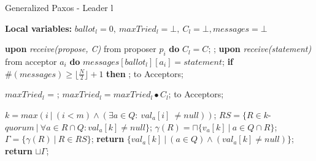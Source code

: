 \begin{algorithm}
	\caption{Generalized Paxos - Leader l}
	\textbf{Local variables:} $ballot_l = 0,\ maxTried_l = \bot,\ C_l = \bot, messages = \bot$
	\begin{algorithmic}[1]
		\State \textbf{upon} \textit{receive(propose, C)} from proposer $p_i$ \textbf{do} 
		\State \hspace{\algorithmicindent} $C_l = C$;
		\State \hspace{\algorithmicindent} ;
		\State
		\State \textbf{upon} \textit{receive(statement)} from acceptor $a_i$ \textbf{do}
		\State \hspace{\algorithmicindent}  $messages[ballot_l][a_i] = statement$;
		\State \hspace{\algorithmicindent} \textbf{if} $\#(messages) \geq \lfloor \frac{N}{2} \rfloor +1$ \textbf{then} 
		\State \hspace{\algorithmicindent}\hspace{\algorithmicindent} ;
		\State
		\State {} to Acceptors;
		\EndFunction
		
		\State
		\State $maxTried_l$ = ;
		\State $maxTried_l = maxTried_l \bullet C_l$;
		\State {} to Acceptors;
		\EndFunction
		
		\State
		\State $k = max(i\ |\ (i < m) \wedge (\exists a \in Q :\ val_a[i]\ \neq null))$;
		\State $RS = \{R \in k$-$quorum\ |\ \forall a \in R \cap Q : val_a[k] \neq null\}$;
		\State $\gamma(R) = \sqcap \{v_a[k]\ |\ a \in Q \cap R \}$;
		\State $\Gamma = \{\gamma(R)\ |\ R \in RS \}$;
		\State
		\State \textbf{return} $\{val_a[k]\ |\ (a \in Q) \wedge (val_a[k] \neq null)\}$;
		\Else
		\State \textbf{return} $\sqcup \Gamma$;
		\EndIf
		\EndFunction
		
	\end{algorithmic}
\end{algorithm}

